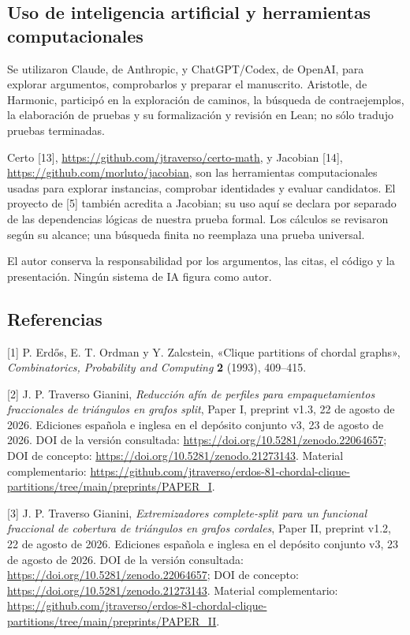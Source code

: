 \documentclass[spanish,11pt,a4paper]{article}
\begin{document}
\subsection{Uso de inteligencia artificial y herramientas
computacionales}\label{uso-de-inteligencia-artificial-y-herramientas-computacionales}

Se utilizaron Claude, de Anthropic, y ChatGPT/Codex, de OpenAI, para
explorar argumentos, comprobarlos y preparar el manuscrito. Aristotle,
de Harmonic, participó en la exploración de caminos, la búsqueda de
contraejemplos, la elaboración de pruebas y su formalización y revisión
en Lean; no sólo tradujo pruebas terminadas.

Certo {[}13{]}, \url{https://github.com/jtraverso/certo-math}, y
Jacobian {[}14{]}, \url{https://github.com/morluto/jacobian}, son las
herramientas computacionales usadas para explorar instancias, comprobar
identidades y evaluar candidatos. El proyecto de {[}5{]} también
acredita a Jacobian; su uso aquí se declara por separado de las
dependencias lógicas de nuestra prueba formal. Los cálculos se revisaron
según su alcance; una búsqueda finita no reemplaza una prueba universal.

El autor conserva la responsabilidad por los argumentos, las citas, el
código y la presentación. Ningún sistema de IA figura como autor.

\subsection{Referencias}\label{referencias}

{[}1{]} P. Erdős, E. T. Ordman y Y. Zalcstein, «Clique partitions of
chordal graphs», \emph{Combinatorics, Probability and Computing}
\textbf{2} (1993), 409--415.

{[}2{]} J. P. Traverso Gianini, \emph{Reducción afín de perfiles para
empaquetamientos fraccionales de triángulos en grafos split}, Paper I,
preprint v1.3, 22 de agosto de 2026. Ediciones española e inglesa en el
depósito conjunto v3, 23 de agosto de 2026. DOI de la versión
consultada: \url{https://doi.org/10.5281/zenodo.22064657}; DOI de
concepto: \url{https://doi.org/10.5281/zenodo.21273143}. Material
complementario:
\url{https://github.com/jtraverso/erdos-81-chordal-clique-partitions/tree/main/preprints/PAPER_I}.

{[}3{]} J. P. Traverso Gianini, \emph{Extremizadores complete-split para
un funcional fraccional de cobertura de triángulos en grafos cordales},
Paper II, preprint v1.2, 22 de agosto de 2026. Ediciones española e
inglesa en el depósito conjunto v3, 23 de agosto de 2026. DOI de la
versión consultada: \url{https://doi.org/10.5281/zenodo.22064657}; DOI
de concepto: \url{https://doi.org/10.5281/zenodo.21273143}. Material
complementario:
\url{https://github.com/jtraverso/erdos-81-chordal-clique-partitions/tree/main/preprints/PAPER_II}.
\end{document}
